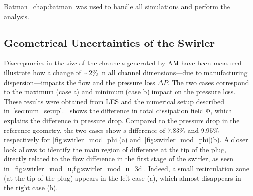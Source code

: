 Batman~\cref{chap:batman} was used to handle all simulations and perform the analysis.

\subsection{Geometrical Uncertainties of the Swirler}

Discrepancies in the size of the channels generated by AM have been measured.  illustrate how a change of $\sim2$\% in all channel dimensions---due to manufacturing dispersion---impacts the flow and the pressure loss $\Delta P$. The two cases correspond to the maximum (case a) and minimum (case b) impact on the pressure loss. These results were obtained from LES and the numerical setup described in~\cref{sec:num_setup}.
~shows the difference in total dissipation field $\mathrm{\overline{\Phi}}$, which explains the difference in pressure drop.%
Compared to the pressure drop in the reference geometry, the two cases show a difference of $7.83\%$ and $9.95\%$ respectively for~\cref{fig:swirler_mod_phi}(a) and~\cref{fig:swirler_mod_phi}(b). 
A closer look allows to identify the main region of difference at the tip of the plug, directly related to the flow difference in the first stage of the swirler, as seen in~\cref{fig:swirler_mod_u,fig:swirler_mod_u_3d}. Indeed, a small recirculation zone (at the tip of the plug) appears in the left case (a), which almost disappears in the right case (b).

